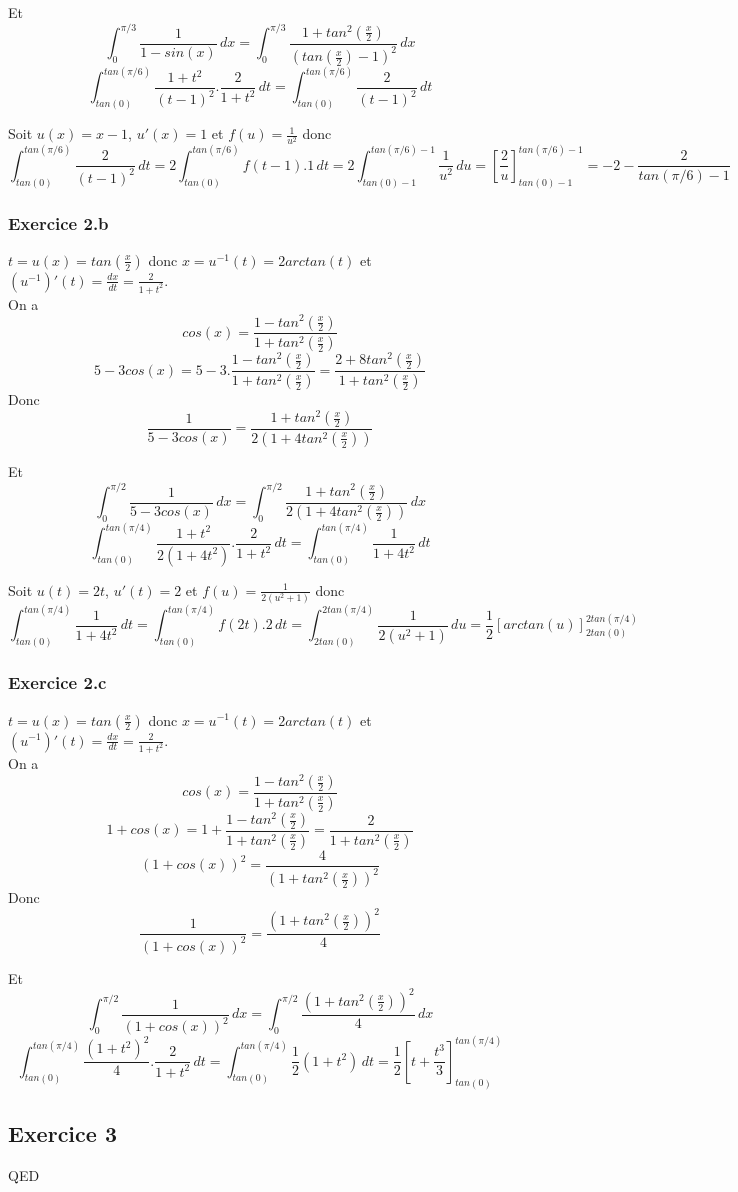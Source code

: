 \documentclass[]{book}
\theoremstyle{definition}
\begin{document}
Et
$$\int_0^{\pi/3}{\frac{1}{1-sin(x)}\,dx} = \int_0^{\pi/3}{\frac{1+tan^2(\frac{x}{2})}{(tan(\frac{x}{2})-1)^2}\,dx}$$
$$\int_{tan(0)}^{tan(\pi/6)}{\frac{1+t^2}{(t-1)^2}.\frac{2}{1+t^2}\,dt} = \int_{tan(0)}^{tan(\pi/6)}{\frac{2}{(t-1)^2}\,dt}$$

Soit $u(x)=x-1$, $u'(x)=1$ et $f(u) = \frac{1}{u^2}$ donc
$$\int_{tan(0)}^{tan(\pi/6)}{\frac{2}{(t-1)^2}\,dt} = 2\int_{tan(0)}^{tan(\pi/6)}{f(t-1).1\,dt}=2\int_{tan(0)-1}^{tan(\pi/6)-1}{\frac{1}{u^2}\,du} = [\frac{2}{u}]_{tan(0)-1}^{tan(\pi/6)-1} = -2 - \frac{2}{tan(\pi/6)-1}$$


\subsubsection*{Exercice 2.b}
$t = u(x) = tan(\frac{x}{2})$ donc $x = u^{-1}(t) = 2arctan(t)$ et $(u^{-1})'(t) = \frac{dx}{dt} = \frac{2}{1+t^2}$.\\
On a 
$$cos(x)=\frac{1-tan^2(\frac{x}{2})}{1+tan^2(\frac{x}{2})}$$
$$5-3cos(x)=5-3.\frac{1-tan^2(\frac{x}{2})}{1+tan^2(\frac{x}{2})} = \frac{2+8tan^2(\frac{x}{2})}{1+tan^2(\frac{x}{2})}$$
Donc
$$\frac{1}{5-3cos(x)} = \frac{1+tan^2(\frac{x}{2})}{2(1+4tan^2(\frac{x}{2}))}$$

Et
$$\int_{0}^{\pi/2}{\frac{1}{5-3cos(x)}\,dx} = \int_{0}^{\pi/2}{\frac{1+tan^2(\frac{x}{2})}{2(1+4tan^2(\frac{x}{2}))}\,dx}$$
$$\int_{tan(0)}^{tan(\pi/4)}{\frac{1+t^2}{2(1+4t^2)}.\frac{2}{1+t^2}\,dt} = \int_{tan(0)}^{tan(\pi/4)}{\frac{1}{1+4t^2}\,dt}$$

Soit $u(t)=2t$, $u'(t)=2$ et $f(u)=\frac{1}{2(u^2+1)}$ donc
$$\int_{tan(0)}^{tan(\pi/4)}{\frac{1}{1+4t^2}\,dt} = \int_{tan(0)}^{tan(\pi/4)}{f(2t).2\,dt} = \int_{2tan(0)}^{2tan(\pi/4)}{\frac{1}{2(u^2+1)}\,du} = \frac{1}{2}[arctan(u)]_{2tan(0)}^{2tan(\pi/4)}$$


\subsubsection*{Exercice 2.c}
$t = u(x) = tan(\frac{x}{2})$ donc $x = u^{-1}(t) = 2arctan(t)$ et $(u^{-1})'(t) = \frac{dx}{dt} = \frac{2}{1+t^2}$.\\
On a 
$$cos(x)=\frac{1-tan^2(\frac{x}{2})}{1+tan^2(\frac{x}{2})}$$
$$1+cos(x)=1+\frac{1-tan^2(\frac{x}{2})}{1+tan^2(\frac{x}{2})} = \frac{2}{1+tan^2(\frac{x}{2})}$$
$$(1+cos(x))^2 = \frac{4}{(1+tan^2(\frac{x}{2}))^2}$$
Donc
$$\frac{1}{(1+cos(x))^2}=\frac{(1+tan^2(\frac{x}{2}))^2}{4}$$

Et
$$\int_{0}^{\pi/2}{\frac{1}{(1+cos(x))^2}\,dx} = \int_{0}^{\pi/2}{\frac{(1+tan^2(\frac{x}{2}))^2}{4}\,dx}$$
$$\int_{tan(0)}^{tan(\pi/4)}{\frac{(1+t^2)^2}{4}.\frac{2}{1+t^2}\,dt} = \int_{tan(0)}^{tan(\pi/4)}{\frac{1}{2}(1+t^2)\,dt} = \frac{1}{2}[t+\frac{t^3}{3}]_{tan(0)}^{tan(\pi/4)}$$

\subsection*{Exercice 3}

QED
\end{document}
